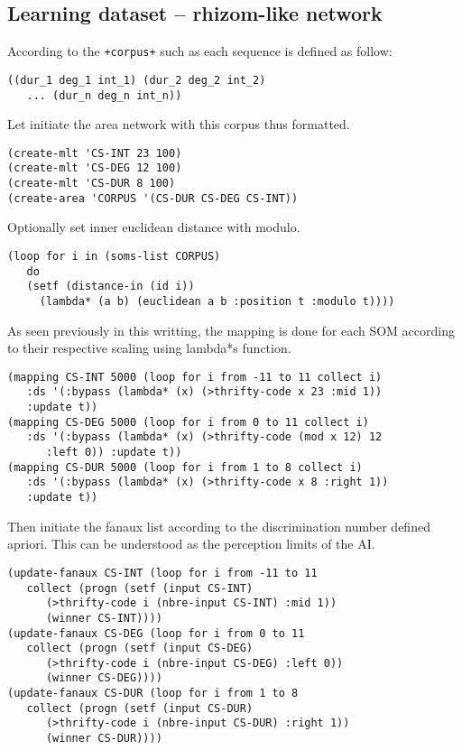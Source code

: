 \subsection{Learning dataset -- rhizom-like network}

\bigskip

\noindent According to the \texttt{+corpus+} such as each sequence is defined as follow:
\begin{lstlisting}[language=N3]
((dur_1 deg_1 int_1) (dur_2 deg_2 int_2) 
   ... (dur_n deg_n int_n))
\end{lstlisting}
 Let initiate the area network with this corpus thus formatted.
\begin{lstlisting}[language=N3]
(create-mlt 'CS-INT 23 100)
(create-mlt 'CS-DEG 12 100)
(create-mlt 'CS-DUR 8 100)
(create-area 'CORPUS '(CS-DUR CS-DEG CS-INT))
\end{lstlisting}
Optionally set inner euclidean distance with modulo.
\begin{lstlisting}[language=N3]
(loop for i in (soms-list CORPUS) 
   do 
   (setf (distance-in (id i)) 
     (lambda* (a b) (euclidean a b :position t :modulo t))))
\end{lstlisting}
As seen previously in this writting, the mapping is done for each SOM according to their respective scaling using \glspl{lambda*} function.
\begin{lstlisting}[language=N3]
(mapping CS-INT 5000 (loop for i from -11 to 11 collect i) 
   :ds '(:bypass (lambda* (x) (>thrifty-code x 23 :mid 1)) 
   :update t))
(mapping CS-DEG 5000 (loop for i from 0 to 11 collect i) 
   :ds '(:bypass (lambda* (x) (>thrifty-code (mod x 12) 12 
      :left 0)) :update t))
(mapping CS-DUR 5000 (loop for i from 1 to 8 collect i) 
   :ds '(:bypass (lambda* (x) (>thrifty-code x 8 :right 1)) 
   :update t))
\end{lstlisting}
Then initiate the fanaux list according to the discrimination number defined apriori. This can be understood as the perception limits of the AI. 
\begin{lstlisting}[language=N3]
(update-fanaux CS-INT (loop for i from -11 to 11 
   collect (progn (setf (input CS-INT) 
      (>thrifty-code i (nbre-input CS-INT) :mid 1)) 
      (winner CS-INT))))
(update-fanaux CS-DEG (loop for i from 0 to 11 
   collect (progn (setf (input CS-DEG) 
      (>thrifty-code i (nbre-input CS-DEG) :left 0)) 
      (winner CS-DEG))))
(update-fanaux CS-DUR (loop for i from 1 to 8 
   collect (progn (setf (input CS-DUR) 
      (>thrifty-code i (nbre-input CS-DUR) :right 1)) 
      (winner CS-DUR))))
\end{lstlisting}
